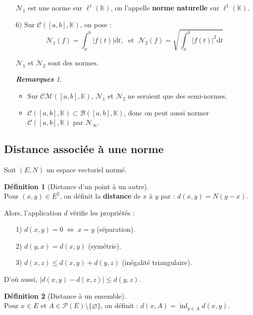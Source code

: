 \documentclass[12pt]{book}
\let\ensembleNombre\mathbb
\newcommand*\K{\ensuremath{\ensembleNombre{K}}}
\newcommand*\B{\ensuremath{\mathcal B}}
\theoremstyle{definition}
\newtheorem*{defi}{Définition}
\theoremstyle{remark}
\newtheorem*{rems}{\textbf{Remarques}}
\newenvironment{fdef}
  {\begin{mdframed}[roundcorner=10pt, linewidth=1pt]\begin{defi}}
  {\end{defi}\end{mdframed}}
\begin{document}
\begin{itemize}
	$\mathcal N_1$ est une norme sur $\ell^1(\K)$, on l'appelle \textbf{norme naturelle} sur $\ell^1(\K)$.
	
	\item[6)] Sur $\mathcal C([a,b], \K)$, on pose : 
	\[
	\boxed{ \mathcal N_1(f) = \int_a^b |f(t)|\mathrm dt, \;\text{ et } \; \mathcal N_2(f) = \sqrt{\int_a^b |f(t)|^2 \mathrm dt} }
	\]	
	
	$\mathcal N_1$ et $\mathcal N_2$ sont des normes.	
	
	\begin{rems}\mbox{~}\\
	\begin{itemize}
	\item Sur $\mathcal{CM}([a,b], \K)$, $\mathcal N_1$ et $\mathcal N_2$ ne seraient que des semi-normes.
	\item $\mathcal C([a,b], \K) \subset \B([a,b], \K)$, donc on peut aussi normer $\mathcal C([a,b], \K)$ par $\mathcal N_\infty $.
	\end{itemize}
	\end{rems}	
	\end{itemize}
	
	\subsection{Distance associée à une norme}
	Soit $(E,N)$ un espace vectoriel normé.
	
	\begin{fdef}[Distance d'un point à un autre]\mbox{~}\\
	Pour $(x,y) \in E^2$, on définit la \textbf{distance} de $x$ à $y$ par : $d(x,y) = N(y-x)$.
	
	\noindent Alors, l'application $d$ vérifie les propriétés :
	\begin{itemize}
	\item[1)] $d(x,y) = 0 \;\Longleftrightarrow\; x = y$ (séparation).
	\item[2)] $d(y,x) = d(x,y)$ (symétrie).
	\item[3)] $d(x,z) \leq d(x,y) + d(y,z)$ (inégalité triangulaire).
	\end{itemize}
	
	\noindent D'où aussi, $|d(x,y) - d(x,z)| \leq d(y,z)$.		
	\end{fdef}
	
	\begin{fdef}[Distance à un ensemble]\mbox{~}\\
	Pour $x \in E$ et $A \in \mathcal P(E) \setminus \lbrace \varnothing \rbrace$, on définit : $d(x, A) = \inf_{y\in A} d(x,y)$.
	\end{fdef}
	
\end{document}
